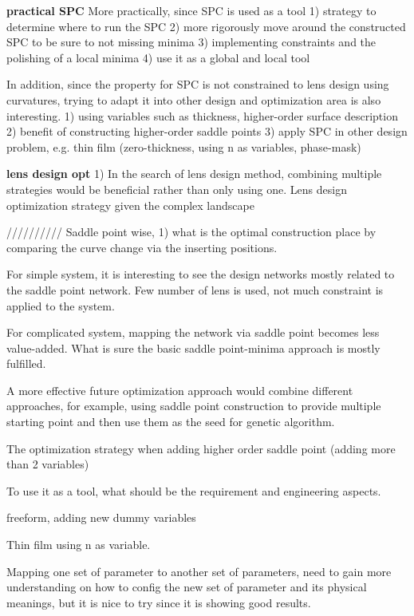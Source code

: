 \textbf{practical SPC}
More practically, since SPC is used as a tool 
1) strategy to determine where to run the SPC
2) more rigorously move around the constructed SPC to be sure to not missing minima
3) implementing constraints and the polishing of a local minima
4) use it as a global and local tool 

In addition, since the property for SPC is not constrained to lens design using curvatures, trying to adapt it into other design and optimization area is also interesting.
1) using variables such as thickness, higher-order surface description
2) benefit of constructing higher-order saddle points
3) apply SPC in other design problem, e.g. thin film (zero-thickness, using n as variables, phase-mask)


\textbf{lens design opt}
1) In the search of lens design method, combining multiple strategies would be beneficial rather than only using one. 
Lens design optimization strategy given the complex landscape




//////////
Saddle point wise, 
1) what is the optimal construction place by comparing the curve change via the inserting positions. 

For simple system, it is interesting to see the design networks mostly related to the saddle point network. Few number of lens is used, not much constraint is applied to the system. 

For complicated system, mapping the network via saddle point becomes less value-added. What is sure the basic saddle point-minima approach is mostly fulfilled. 

A more effective future optimization approach would combine different approaches, for example, using saddle point construction to provide multiple starting point and then use them as the seed for genetic algorithm. 

The optimization strategy when adding higher order saddle point (adding more than 2 variables)


To use it as a tool, what should be the requirement and engineering aspects.



freeform, adding new dummy variables 

Thin film using n as variable.

Mapping one set of parameter to another set of parameters, need to gain more understanding on how to config the new set of parameter and its physical meanings, but it is nice to try since it is showing good results. 




